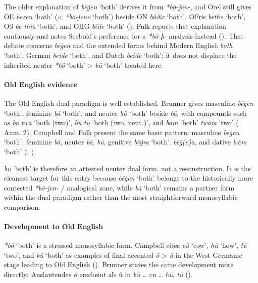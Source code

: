 \documentclass[
  british,
  a4paper,
]{article}
\providecommand{\Recon}[1]{\emph{*#1}}
\begin{document}
The older explanation of {\emph{bēġen}} `both' derives it from
\emph{*bō-jen-}, and Orel still gives OE {\emph{bezen}} `both'
(\textless{} \Recon{bō-jenō} `both') beside ON {\emph{báðir}} `both',
OFris {\emph{bēthe}} `both', OS {\emph{be-thia}} `both', and OHG
{\emph{bēde}} `both' (). Fulk
reports that explanation cautiously and notes Seebold's preference for a
\emph{*bō-þ-} analysis instead (). That debate concerns {\emph{bēġen}} and the extended forms
behind Modern English {\emph{both}} `both', German {\emph{beide}}
`both', and Dutch {\emph{beide}} `both'; it does not displace the
inherited neuter {\emph{*bō}} `both' \textgreater{} {\emph{bū}} `both'
treated here.

\paragraph{Old English evidence}\label{old-english-evidence-9}

The Old English dual paradigm is well established. Brunner gives
masculine {\emph{bēġen}} `both', feminine {\emph{bā}} `both', and neuter
{\emph{bū}} `both' beside \emph{bā}, with compounds such as \emph{bā}
\emph{twā} `both (two)', \emph{bū} \emph{tū} `both (two, neut.)', and
\emph{bām} `both' \emph{twām} `two'
( Anm. 2).
Campbell and Fulk present the same basic pattern: masculine
{\emph{bēġen}} `both', feminine \emph{bā}, neuter \emph{bā}, \emph{bū},
genitive \emph{bēġra} `both', \emph{bēġ(e)a}, and dative {\emph{bǣm}}
`both' (;
).

{\emph{bū}} `both' is therefore an attested neuter dual form, not a
reconstruction. It is the cleanest target for this entry because
{\emph{bēġen}} `both' belongs to the historically more contested
\emph{*bō-jen-} / analogical zone, while \emph{bā} `both' remains a
partner form within the dual paradigm rather than the most
straightforward monosyllabic comparison.

\paragraph{Development to Old
English}\label{development-to-old-english-9}

{\emph{*bō}} `both' is a stressed monosyllabic form. Campbell cites
\emph{cū} `cow', \emph{hū} `how', \emph{tū} `two', and {\emph{bū}}
`both' as examples of final accented \emph{ō} \textgreater{} \emph{ū} in
the West Germanic stage leading to Old English
(). Brunner states
the same development more directly: Auslautendes \emph{ō} erscheint als
û in \emph{bū} \ldots{} cu \ldots{} \emph{hū}, \emph{tū}
().
\end{document}
